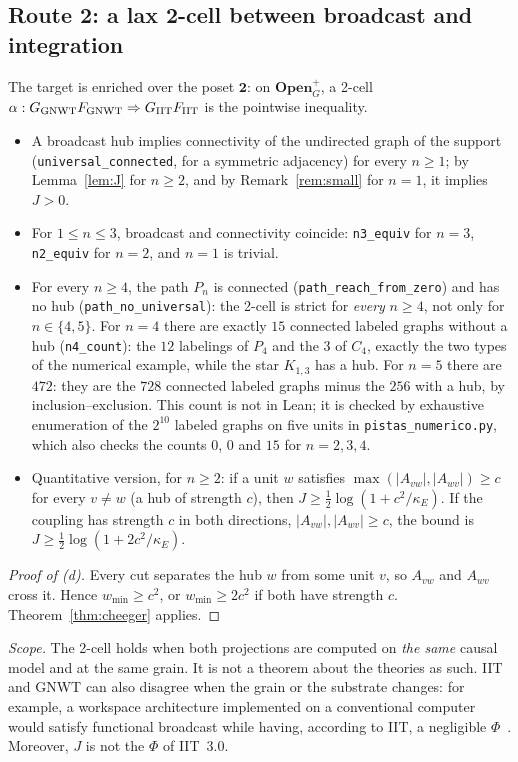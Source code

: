 \subsection{Route 2: a lax 2-cell between broadcast and integration}\label{sec:via2}
The target is enriched over the poset $\mathbf 2$: on $\mathbf{Open}_G^{+}$, a 2-cell $\alpha:G_{\rm GNWT}F_{\rm GNWT}\Rightarrow G_{\rm IIT}F_{\rm IIT}$ is the pointwise inequality.
\begin{theorem}\label{thm:laxa}
\begin{itemize}
\item[(a)] A broadcast hub implies connectivity of the undirected graph of the support (\texttt{universal\_connected}, for a symmetric adjacency) for every $n\ge1$; by Lemma~\ref{lem:J} for $n\ge2$, and by Remark~\ref{rem:small} for $n=1$, it implies $J>0$.
\item[(b)] For $1\le n\le3$, broadcast and connectivity coincide: \texttt{n3\_equiv} for $n=3$, \texttt{n2\_equiv} for $n=2$, and $n=1$ is trivial.
\item[(c)] For every $n\ge4$, the path $P_n$ is connected (\texttt{path\_reach\_from\_zero}) and has no hub (\texttt{path\_no\_universal}): the 2-cell is strict for \emph{every} $n\ge4$, not only for $n\in\{4,5\}$. For $n=4$ there are exactly $15$ connected labeled graphs without a hub (\texttt{n4\_count}): the $12$ labelings of $P_4$ and the $3$ of $C_4$, exactly the two types of the numerical example, while the star $K_{1,3}$ has a hub. For $n=5$ there are $472$: they are the $728$ connected labeled graphs minus the $256$ with a hub, by inclusion--exclusion. This count is not in Lean; it is checked by exhaustive enumeration of the $2^{10}$ labeled graphs on five units in \texttt{pistas\_numerico.py}, which also checks the counts $0$, $0$ and $15$ for $n=2,3,4$.
\item[(d)] Quantitative version, for $n\ge2$: if a unit $w$ satisfies $\max(|A_{vw}|,|A_{wv}|)\ge c$ for every $v\ne w$ (a hub of strength $c$), then $J\ge\tfrac12\log(1+c^2/\kappa_E)$. If the coupling has strength $c$ in both directions, $|A_{vw}|,|A_{wv}|\ge c$, the bound is $J\ge\tfrac12\log(1+2c^2/\kappa_E)$.
\end{itemize}
\end{theorem}
\begin{proof}[Proof of (d)]
Every cut separates the hub $w$ from some unit $v$, so $A_{vw}$ and $A_{wv}$ cross it. Hence $w_{\min}\ge c^2$, or $w_{\min}\ge2c^2$ if both have strength $c$. Theorem~\ref{thm:cheeger} applies.
\end{proof}
\emph{Scope.} The 2-cell holds when both projections are computed on \emph{the same} causal model and at the same grain. It is not a theorem about the theories as such. IIT and GNWT can also disagree when the grain or the substrate changes: for example, a workspace architecture implemented on a conventional computer would satisfy functional broadcast while having, according to IIT, a negligible $\Phi$~\cite{TononiKoch2015}. Moreover, $J$ is not the $\Phi$ of IIT~3.0.

